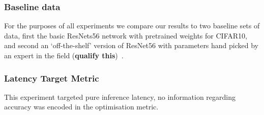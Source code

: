 \documentclass[../Dissertation.tex]{subfiles}
\begin{document}
\doublespacing

\subsubsection{Baseline data}
For the purposes of all experiments we compare our results to two baseline sets of data, first the basic ResNets56 network with pretrained weights for CIFAR10, and second an `off-the-shelf' version of ResNet56 with parameters hand picked by an expert in the field (\textbf{qualify this})~\autocite{liPruningFiltersEfficient2017}.


\subsubsection{Latency Target Metric}
This experiment targeted pure inference latency, no information regarding accuracy was encoded in the optimisation metric. 
\end{document}
